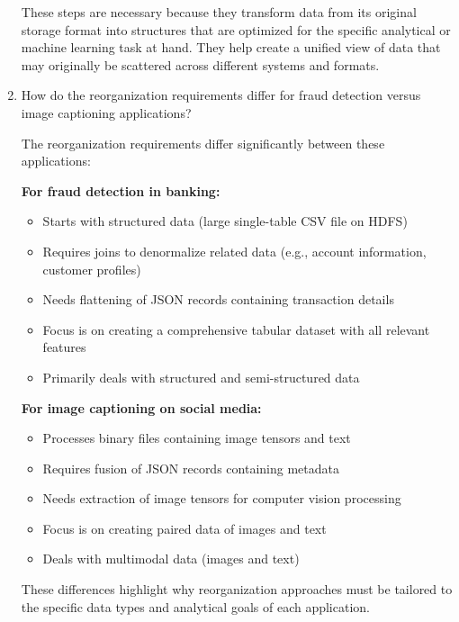 \documentclass[12pt]{article}
\begin{document}
\begin{enumerate}
\begin{tcolorbox}[colback=blue!5!white,colframe=blue!75!black,title={Solution}]
    These steps are necessary because they transform data from its original storage format into structures that are optimized for the specific analytical or machine learning task at hand. They help create a unified view of data that may originally be scattered across different systems and formats.
    \end{tcolorbox}
    
    \item How do the reorganization requirements differ for fraud detection versus image captioning applications?
    
    \begin{tcolorbox}[colback=blue!5!white,colframe=blue!75!black,title={Solution}]
    The reorganization requirements differ significantly between these applications:
    
    \textbf{For fraud detection in banking:}
    \begin{itemize}
        \item Starts with structured data (large single-table CSV file on HDFS)
        \item Requires joins to denormalize related data (e.g., account information, customer profiles)
        \item Needs flattening of JSON records containing transaction details
        \item Focus is on creating a comprehensive tabular dataset with all relevant features
        \item Primarily deals with structured and semi-structured data
    \end{itemize}
    
    \textbf{For image captioning on social media:}
    \begin{itemize}
        \item Processes binary files containing image tensors and text
        \item Requires fusion of JSON records containing metadata
        \item Needs extraction of image tensors for computer vision processing
        \item Focus is on creating paired data of images and text
        \item Deals with multimodal data (images and text)
    \end{itemize}
    
    These differences highlight why reorganization approaches must be tailored to the specific data types and analytical goals of each application.
    \end{tcolorbox}
    

\end{enumerate}
\end{document}
